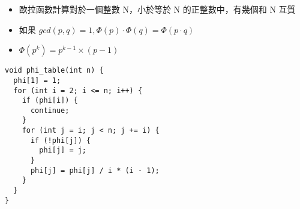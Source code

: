  \begin{itemize}
    \item 歐拉函數計算對於一個整數 N，小於等於 N 的正整數中，有幾個和 N 互質
    \item 如果 $gcd(p, q) = 1, \Phi(p) \cdot \Phi(q) = \Phi(p \cdot q)$
    \item $\Phi(p^k) = p^{k - 1} \times (p - 1)$
\end{itemize}

\begin{lstlisting}
void phi_table(int n) {
  phi[1] = 1;
  for (int i = 2; i <= n; i++) {
    if (phi[i]) {
      continue;
    }
    for (int j = i; j < n; j += i) {
      if (!phi[j]) {
        phi[j] = j;
      }
      phi[j] = phi[j] / i * (i - 1);
    }
  }
}
\end{lstlisting}